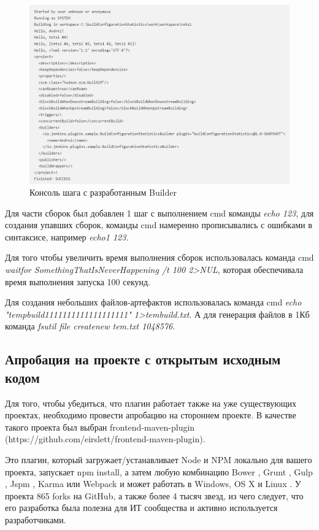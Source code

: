  \begin{figure}[ht!] 
	\center
	\includegraphics [scale=0.57] {my_folder/images//console1}
	\caption{Консоль шага с разработанным Builder} 
	\label{fig:customBuilder}  
\end{figure}



Для части сборок был добавлен 1 шаг с выполнением cmd команды  \textit{echo 123}, для создания упавших сборок, команды cmd намеренно прописывались с ошибками в синтаксисе, например  \textit{echo1 123}.

Для того чтобы увеличить время выполнения сборок использовалась команда cmd  \textit{waitfor SomethingThatIsNeverHappening /t 100  2>NUL}, которая обеспечивала время выполнения запуска 100 секунд.

Для создания небольших файлов-артефактов использовалась команда cmd \textit{echo "tempbuild1111111111111111111"  1>tembuild.txt}. А для генерация файлов в 1Кб команда \textit{fsutil file createnew tem.txt 1048576}.

\subsection{Апробация на проекте с открытым исходным кодом}

Для того, чтобы убедиться, что плагин работает также на уже существующих проектах, необходимо провести апробацию на стороннем проекте. В качестве такого проекта был выбран frontend-maven-plugin (https://github.com/eirslett/frontend-maven-plugin). 

Это плагин, который загружает/устанавливает Node и NPM локально для вашего проекта, запускает npm install, а затем любую комбинацию Bower , Grunt , Gulp , Jspm , Karma или Webpack и может работать в Windows, OS X и Linux \cite{frontplugin}. У проекта 865 forks на GitHub, а также более 4 тысяч звезд, из чего следует, что его разработка была полезна для ИТ сообщества и активно используется разработчиками.

